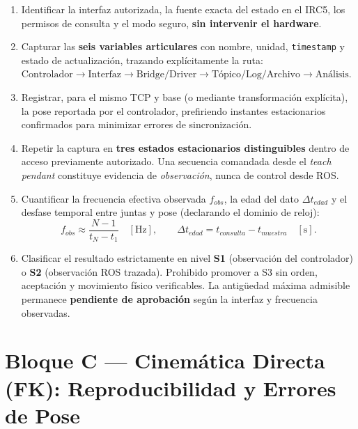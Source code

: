 \documentclass[10pt, a4paper]{article}
\begin{document}
\begin{enumerate}[leftmargin=*, itemsep=2pt]
    \item Identificar la interfaz autorizada, la fuente exacta del estado en el IRC5, los permisos de consulta y el modo seguro, \textbf{sin intervenir el hardware}.
    \item Capturar las \textbf{seis variables articulares} con nombre, unidad, \texttt{timestamp} y estado de actualización, trazando explícitamente la ruta: $\text{Controlador} \to \text{Interfaz} \to \text{Bridge/Driver} \to \text{Tópico/Log/Archivo} \to \text{Análisis}$.
    \item Registrar, para el mismo TCP y base (o mediante transformación explícita), la pose reportada por el controlador, prefiriendo instantes estacionarios confirmados para minimizar errores de sincronización.
    \item Repetir la captura en \textbf{tres estados estacionarios distinguibles} dentro de acceso previamente autorizado. Una secuencia comandada desde el \textit{teach pendant} constituye evidencia de \textit{observación}, nunca de control desde ROS.
    \item Cuantificar la frecuencia efectiva observada $f_{obs}$, la edad del dato $\Delta t_{edad}$ y el desfase temporal entre juntas y pose (declarando el dominio de reloj):
    \begin{equation}
        f_{obs} \approx \frac{N - 1}{t_N - t_1} \quad [\mathrm{Hz}], \qquad
        \Delta t_{edad} = t_{consulta} - t_{muestra} \quad [\mathrm{s}].
        \label{eq:obs_freq}
    \end{equation}
    \item Clasificar el resultado estrictamente en nivel \textbf{S1} (observación del controlador) o \textbf{S2} (observación ROS trazada). Prohibido promover a S3 sin orden, aceptación y movimiento físico verificables. La antigüedad máxima admisible permanece \textbf{pendiente de aprobación} según la interfaz y frecuencia observadas.
\end{enumerate}

\section{Bloque C — Cinemática Directa (FK): Reproducibilidad y Errores de Pose}
\end{document}
